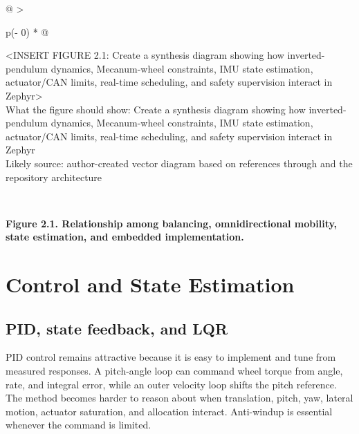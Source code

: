 \begin{longtable}[]{@{}
  >{\raggedright\arraybackslash}p{(\columnwidth - 0\tabcolsep) * }@{}}
\toprule\noalign{}
\begin{minipage}[b]{\linewidth}\raggedright
\textless INSERT FIGURE 2.1: Create a synthesis diagram showing how
inverted-pendulum dynamics, Mecanum-wheel constraints, IMU state
estimation, actuator\slash{}CAN limits, real-time scheduling, and safety
supervision interact in Zephyr\textgreater{}\\
What the figure should show: Create a synthesis diagram showing how
inverted-pendulum dynamics, Mecanum-wheel constraints, IMU state
estimation, actuator\slash{}CAN limits, real-time scheduling, and safety
supervision interact in Zephyr\\
Likely source: author-created vector diagram based on references \cite{grasser2002joe}
through \cite{liu1973scheduling} and the repository architecture\strut
\end{minipage} \\
\midrule\noalign{}
\endhead
\bottomrule\noalign{}
\endlastfoot
\end{longtable}

\begin{center}\singlespacing
{}
\textbf{Figure 2.1. Relationship among balancing, omnidirectional mobility, state estimation, and embedded implementation.}
\end{center}

\section{Control and State Estimation}\label{control-and-state-estimation}

\subsection{PID, state feedback, and LQR}\label{pid-state-feedback-and-lqr}

PID control remains attractive because it is easy to implement and tune
from measured responses. A pitch-angle loop can command wheel torque
from angle, rate, and integral error, while an outer velocity loop
shifts the pitch reference. The method becomes harder to reason about
when translation, pitch, yaw, lateral motion, actuator saturation, and
allocation interact. Anti-windup is essential whenever the command is
limited.


